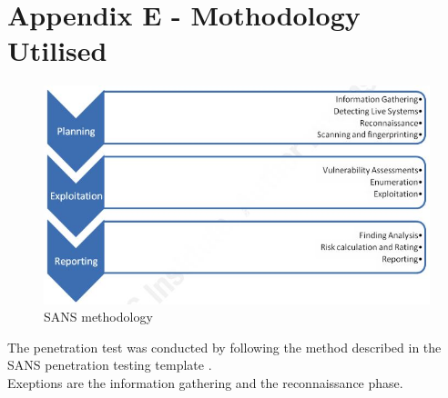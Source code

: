 \section{Appendix E - Mothodology Utilised}

\begin{figure}[h!]
\centering
\includegraphics[scale=0.8]{./Graphics/sansmeth.JPG}
\caption{SANS methodology \cite{sans}}
\end{figure}

The penetration test was conducted by following the method described in the SANS penetration testing template \cite{sans}. \\
Exeptions are the information gathering and the reconnaissance phase.
